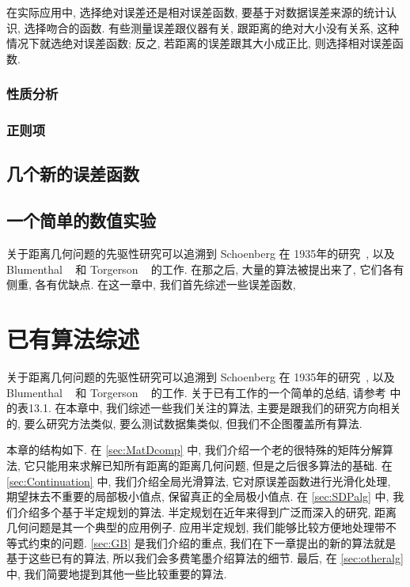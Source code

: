 \documentclass{CASthesis_zzk}
\begin{document}
在实际应用中, 选择绝对误差还是相对误差函数, 要基于对数据误差来源的统计认识,
选择吻合的函数.
有些测量误差跟仪器有关, 跟距离的绝对大小没有关系, 这种情况下就选绝对误差函数;
反之, 若距离的误差跟其大小成正比, 则选择相对误差函数.

\subsection{性质分析}


\subsection{正则项}

\section{几个新的误差函数}
\label{sec:newfun}



\section{一个简单的数值实验}
\label{sec:funnuc}




关于距离几何问题的先驱性研究可以追溯到 Schoenberg 在 
1935年的研究~\cite{Schoenberg1935}, 
以及 Blumenthal ~\cite{Blumenthal1953} 和 Torgerson ~\cite{Torgerson1958} 的工作.
在那之后, 大量的算法被提出来了, 它们各有侧重, 各有优缺点. 
在这一章中, 我们首先综述一些误差函数, 


\chapter{已有算法综述}
\label{cha:algrev}

关于距离几何问题的先驱性研究可以追溯到 Schoenberg 在 
1935年的研究~\cite{Schoenberg1935}, 
以及 Blumenthal ~\cite{Blumenthal1953} 和 Torgerson ~\cite{Torgerson1958} 的工作.
关于已有工作的一个简单的总结, 请参考 \cite{Fang2013} 中的表13.1. 
在本章中, 我们综述一些我们关注的算法, 主要是跟我们的研究方向相关的,
要么研究方法类似, 要么测试数据集类似, 但我们不企图覆盖所有算法.


本章的结构如下.
在 \ref{sec:MatDcomp} 中, 我们介绍一个老的很特殊的矩阵分解算法,
它只能用来求解已知所有距离的距离几何问题, 但是之后很多算法的基础.
在 \ref{sec:Continuation} 中, 我们介绍全局光滑算法, 它对原误差函数进行光滑化处理,
期望抹去不重要的局部极小值点, 保留真正的全局极小值点.
在 \ref{sec:SDPalg} 中, 我们介绍多个基于半定规划的算法. 
半定规划在近年来得到广泛而深入的研究, 距离几何问题是其一个典型的应用例子.
应用半定规划, 我们能够比较方便地处理带不等式约束的问题.
\ref{sec:GB} 是我们介绍的重点, 我们在下一章提出的新的算法就是基于这些已有的算法,
所以我们会多费笔墨介绍算法的细节.
最后, 在 \ref{sec:otheralg} 中, 我们简要地提到其他一些比较重要的算法.
\end{document}
